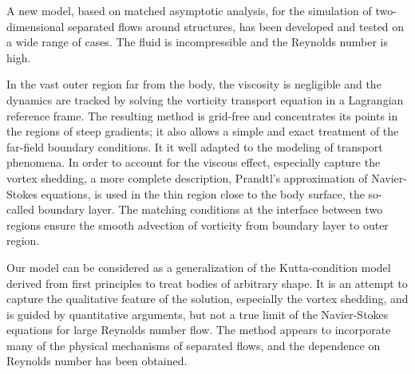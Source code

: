 



A new model, based on matched asymptotic analysis, for the simulation of two-dimensional separated flows around structures, has been developed and tested on a wide range of cases.
The fluid is incompressible and the Reynolds number is high.

In the vast outer region far from the body, the viscosity is negligible and the dynamics are tracked by solving the vorticity transport equation in a Lagrangian reference frame.
The resulting method is grid-free and concentrates its points in the regions of steep gradients; it also allows a simple and exact treatment of the far-field boundary conditions.
It it well adapted to the modeling of transport phenomena.
In order to account for the viscous effect, especially capture the vortex shedding, a more complete description, Prandtl's approximation of Navier-Stokes equations, is used in the thin region close to the body surface, the so-called boundary layer.
The matching conditions at the interface between two regions ensure the smooth advection of vorticity from boundary layer to outer region.

Our model can be considered as a generalization of the Kutta-condition model derived from first principles to treat bodies of arbitrary shape.
It is an attempt to capture the qualitative feature of the solution, especially the vortex shedding, and is guided by quantitative arguments, but not a true limit of the Navier-Stokes equations for large Reynolds number flow.
The method appears to incorporate many of the physical mechanisms of separated flows, and the dependence on Reynolds number has been obtained.
